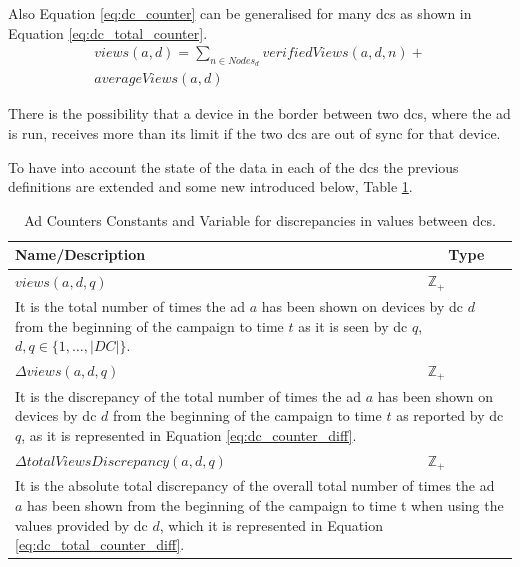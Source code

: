 Also Equation \ref{eq:dc_counter} can be generalised for many \glspl{dc} as shown in Equation \ref{eq:dc_total_counter}.
\begin{multline} \label{eq:dc_total_counter}
	views(a, d) = \sum_{n \in Nodes_{d}}  verifiedViews(a, d, n) +\\ averageViews(a, d)
\end{multline}

There is the possibility that a device in the border between two \glspl{dc}, where the ad is run, receives more than its limit if the two \glspl{dc} are out of sync for that device.

To have into account the state of the data in each of the \glspl{dc} the previous definitions are extended and some new introduced below, Table \ref{tab:ads_entended_constants_variables}.
\begin{table}[!ht]
	\begin{tabular}{|p{6.5cm}|p{.2cm}| }
		\hline
			Name/Description & \multicolumn{1}{c|}{Type} \\
		\hline
		\hline
			 $views(a, d, q)$ & $\mathbb{Z}_{+}$ \\
		\hline
			\multicolumn{2}{|p{8.1cm}|}{It is the total number of times the ad $a$ has been shown on devices by \gls{dc} $d$ from the beginning of the campaign to time $t$ as it is seen by \gls{dc} $q$, $d, q \in \{1,\dots, |DC|\}$.}  \\
		\hline
		\hline
			 $\Delta views(a, d, q)$ & $\mathbb{Z}_{+}$ \\
		\hline
			 \multicolumn{2}{|p{8.1cm}|}{It is the discrepancy of the total number of times the ad $a$ has been shown on devices by \gls{dc} $d$ from the beginning of the campaign to time $t$ as reported by \gls{dc} $q$, as it is represented in Equation \ref{eq:dc_counter_diff}.} \\
		\hline
		\hline
			 $\Delta totalViewsDiscrepancy(a, d, q)$ & $\mathbb{Z}_{+}$ \\
		\hline
			\multicolumn{2}{|p{8.1cm}|}{It is the absolute total discrepancy of the overall total number of times the ad $a$ has been shown from the beginning of the campaign to time t when using the values provided by \gls{dc} $d$, which it is represented in Equation \ref{eq:dc_total_counter_diff}.} \\
		\hline
	\end{tabular}
	
	\caption{Ad Counters Constants and Variable for discrepancies in values between \glspl{dc}.}
	\label{tab:ads_entended_constants_variables}
\end{table}
